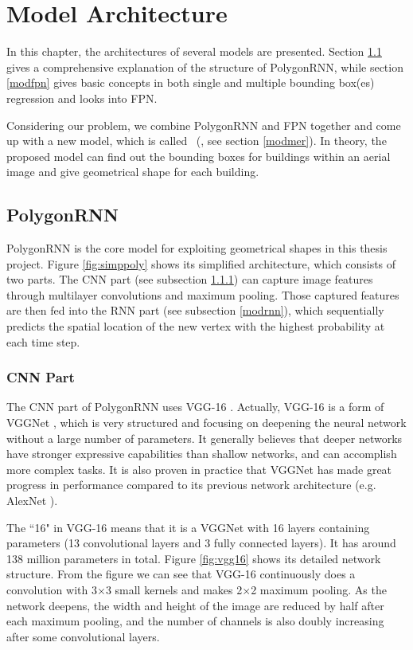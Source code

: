 \chapter{Model Architecture}\label{mdlarc}
In this chapter, the architectures of several models are presented. Section \ref{modpoly} gives a comprehensive explanation of the structure of PolygonRNN, while section \ref{modfpn} gives basic concepts in both single and multiple bounding box(es) regression and looks into FPN.

Considering our problem, we combine PolygonRNN and FPN together and come up with a new model, which is called \modelnameshort\ (\modelnamelong, see section \ref{modmer}). In theory, the proposed model can find out the bounding boxes for buildings within an aerial image and give geometrical shape for each building.
 
\section{PolygonRNN}\label{modpoly}

PolygonRNN is the core model for exploiting geometrical shapes in this thesis project. Figure \ref{fig:simppoly} shows its simplified architecture, which consists of two parts. The CNN part (see subsection \ref{modcnn}) can capture image features through multilayer convolutions and maximum pooling. Those captured features are then fed into the RNN part (see subsection \ref{modrnn}), which sequentially predicts the spatial location of the new vertex with the highest probability at each time step.



\subsection{CNN Part}\label{modcnn}
The CNN part of PolygonRNN uses VGG-16 \cite{vgg16}. Actually, VGG-16 is a form of VGGNet \cite{vgg16}, which is very structured and focusing on deepening the neural network without a large number of parameters. It generally believes that deeper networks have stronger expressive capabilities than shallow networks, and can accomplish more complex tasks. It is also proven in practice that VGGNet has made great progress in performance compared to its previous network architecture (e.g. AlexNet \cite{alexnet}).

The ``16" in VGG-16 means that it is a VGGNet with 16 layers containing parameters (13 convolutional layers and 3 fully connected layers). It has around 138 million parameters in total. Figure \ref{fig:vgg16} shows its detailed network structure. From the figure we can see that VGG-16 continuously does a convolution with 3$\times$3 small kernels and makes 2$\times$2 maximum pooling. As the network deepens, the width and height of the image are reduced by half after each maximum pooling, and the number of channels is also doubly increasing after some convolutional layers.

